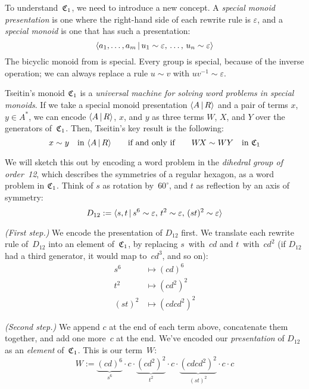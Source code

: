 \documentclass[../generics]{subfiles}
\begin{document}
To understand~$\mathfrak{C}_1$, we need to introduce a new concept. A \emph{special monoid presentation} is one where the right-hand side of each rewrite rule is $\varepsilon$, and a \emph{special monoid} is one that has such a presentation:
\[\langle a_1, \ldots, a_m\,|\,u_1 \sim \varepsilon,\, \ldots,\, u_n \sim \varepsilon\rangle\]
The bicyclic monoid from  is special. Every group is special, because of the inverse operation; we can always replace a rule $u\sim v$ with $uv^{-1}\sim\varepsilon$.

Tseitin's monoid $\mathfrak{C}_1$ is a \textsl{universal machine for solving word problems in special monoids}. If we take a special monoid presentation $\langle A\,|\,R\rangle$ and a pair of terms $x$, $y\in A^*$, we can encode $\langle A\,|\,R\rangle$, $x$, and $y$ as three terms $W\!$, $X$, and $Y$ over the generators of~$\mathfrak{C}_1$. Then, Tseitin's key result is the following:
\[x\sim y\quad\text{in $\langle A\,|\,R\rangle$}\qquad \text{if and only if} \qquad W\! X\sim WY \quad \text{in $\mathfrak{C}_1$}\]

We will sketch this out by encoding a word problem in the \emph{dihedral group of order~12}, which describes the symmetries of a regular hexagon, as a word problem in $\mathfrak{C}_1$. Think of $s$ as rotation by~$60^\circ$, and $t$ as reflection by an axis of symmetry:
\[D_{12} := \langle s,t\,|\,s^6\sim\varepsilon,\, t^2\sim\varepsilon,\, (st)^2\sim \varepsilon\rangle\]

\smallskip

\emph{(First step.)} We encode the presentation of $D_{12}$ first. We translate each rewrite rule of~$D_{12}$ into an element of~$\mathfrak{C}_1$, by replacing $s$~with~$cd$ and $t$~with~$cd^2$ (if $D_{12}$ had a third generator, it would map to~$cd^3$, and so on):
\begin{align*}
s^6 &\mapsto (cd)^6\\
t^2 &\mapsto (cd^2)^2\\
(st)^2 &\mapsto (cdcd^2)^2
\end{align*}

\smallskip

\emph{(Second step.)} We append $c$ at the end of each term above, concatenate them together, and add one more~$c$ at the end. We've encoded our \emph{presentation} of $D_{12}$ as an \emph{element} of~$\mathfrak{C}_1$. This is our term~$W$:
\[
W := \underbrace{(cd)^6}_{s^6}{} \cdot c\cdot \underbrace{(cd^2)^2}_{t^2}{} \cdot c\cdot \underbrace{(cdcd^2)^2}_{(st)^2} {}\cdot c\cdot c
\]
\end{document}
